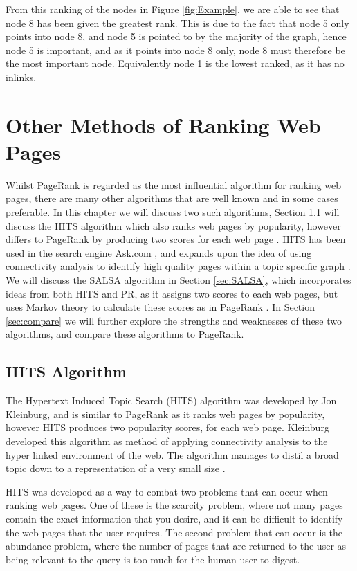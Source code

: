 \documentclass[11pt]{report}
\begin{document}
From this ranking of the nodes in Figure \ref{fig:Example}, we are able to see that node 8 has been given the greatest rank. This is due to the fact that node 5 only points into node 8, and node 5 is pointed to by the majority of the graph, hence node 5 is important, and as it points into node 8 only, node 8 must therefore be the most important node. Equivalently node 1 is the lowest ranked, as it has no inlinks.



\chapter{Other Methods of Ranking Web Pages}\label{chap:Other}
Whilst PageRank is regarded as the most influential algorithm for ranking web pages, there are many other algorithms that are well known and in some cases preferable. In this chapter we will discuss two such algorithms, Section \ref{sec:HITS} will discuss the HITS algorithm which also ranks web pages by popularity, however differs to PageRank by producing two scores for each web page \cite{kleinberg1999authoritative}. HITS has been used in the search engine Ask.com \cite{bonato}, and expands upon the idea of using connectivity analysis to identify high quality pages within a topic specific graph \cite{manning}. We will discuss the SALSA algorithm in Section \ref{sec:SALSA}, which incorporates ideas from both HITS and PR, as it assigns two scores to each web pages, but uses Markov theory to calculate these scores as in PageRank \cite{lempel2000stochastic}. In Section \ref{sec:compare} we will further explore the strengths and weaknesses of these two algorithms, and compare these algorithms to PageRank.

\section{HITS Algorithm} \label{sec:HITS}
The Hypertext Induced Topic Search (HITS) algorithm was developed by Jon Kleinburg, and is similar to PageRank as it ranks web pages by popularity, however HITS produces two popularity scores, for each web page.  Kleinburg developed this algorithm as method of applying connectivity analysis to the hyper linked environment of the web. The algorithm manages to distil a broad topic down to a representation of a very small size \cite{kleinberg1999authoritative}.

HITS was developed as a way to combat two problems that can occur when ranking web pages. One of these is the scarcity problem, where not many pages contain the exact information that you desire, and it can be difficult to identify the web pages that the user requires. The second problem that can occur is the abundance problem, where the number of pages that are returned to the user as being relevant to the query is too much for the human user to digest. 
\end{document}
